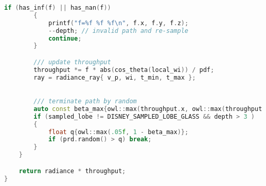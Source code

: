 \begin{lstlisting}[language=C++, caption=path construction routine, basicstyle=\tiny]
        if (has_inf(f) || has_nan(f))
        {
            printf("f=%f %f %f\n", f.x, f.y, f.z);
            --depth; // invalid path and re-sample
            continue;
        }

        /// update throughput
        throughput *= f * abs(cos_theta(local_wi)) / pdf;
        ray = radiance_ray{ v_p, wi, t_min, t_max };
        

        /// terminate path by random
        auto const beta_max{owl::max(throughput.x, owl::max(throughput.y, throughput.z))};
        if (sampled_lobe != DISNEY_SAMPLED_LOBE_GLASS && depth > 3 )
        {
            float q{owl::max(.05f, 1 - beta_max)};
            if (prd.random() > q) break;
        }
    }

    return radiance * throughput;
}
\end{lstlisting}